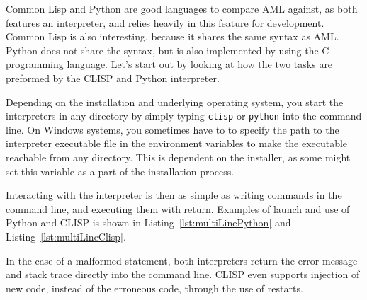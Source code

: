 Common Lisp and Python are good languages to compare AML against, as both features an interpreter, and relies heavily in this feature for development. Common Lisp is also interesting, because it shares the same syntax as AML. Python does not share the syntax, but is also implemented by using the C programming language. Let's start out by looking at how the two tasks are preformed by the CLISP and Python interpreter.

Depending on the installation and underlying operating system, you start the interpreters in any directory by simply typing \texttt{clisp} or \texttt{python} into the command line. On Windows systems, you sometimes have to to specify the path to the interpreter executable file in the environment variables to make the executable reachable from any directory. This is dependent on the installer, as some might set this variable as a part of the installation process.

Interacting with the interpreter is then as simple as writing commands in the command line, and executing them with return. Examples of launch and use of Python and CLISP is shown in Listing~\ref{lst:multiLinePython} and Listing~\ref{lst:multiLineClisp}.



In the case of a malformed statement, both interpreters return the error message and stack trace directly into the command line. CLISP even supports injection of new code, instead of the erroneous code, through the use of restarts.

